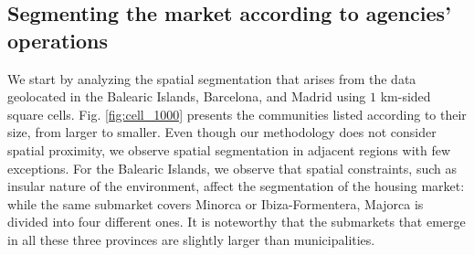 \subsection{Segmenting the market according to agencies' operations}\label{sec:segmentation_cells}

We start by analyzing the spatial segmentation that arises from the data geolocated in the Balearic Islands, Barcelona, and Madrid using $1$ km-sided square cells. Fig. \ref{fig:cell_1000} presents the communities listed according to their size, from larger to smaller. Even though our methodology does not consider spatial proximity, we observe spatial segmentation in adjacent regions with few exceptions. For the Balearic Islands, we observe that spatial constraints, such as insular nature of the environment, affect the segmentation of the housing market: while the same submarket covers Minorca or Ibiza-Formentera, Majorca is divided into four different ones. It is noteworthy that the submarkets that emerge in all these three provinces are slightly larger than municipalities.

